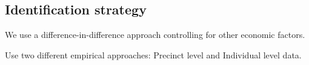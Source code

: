 \documentclass[12pt,a4paper]{article}
\begin{document}

\subsection{Identification strategy}


We use a difference-in-difference approach controlling for other economic factors. 

Use two different empirical approaches: Precinct level and Individual level data.



\end{document}
